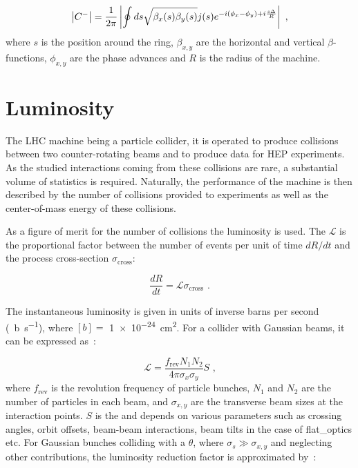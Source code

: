 \begin{equation}
    \left\lvert C^{-} \right\rvert = \frac{1}{2 \pi} \left\lvert  \oint ds \sqrt{\beta_x(s) \beta_y(s)} j(s) e^{-i \left( \phi_x - \phi_y \right) + i \frac{s \Delta}{R}}  \right\rvert \text{ ,}
    \label{equation:deltaqmin_guignard}
\end{equation}
where \(s\) is the position around the ring, \(\beta_{x,y}\) are the horizontal and vertical \(\beta\)-functions, \(\phi_{x,y}\) are the phase advances and \(R\) is the radius of the machine.

\section{Luminosity}
\label{section:luminosity}

The \gls{LHC} machine being a particle collider, it is operated to produce collisions between two counter-rotating beams and to produce data for \gls{HEP} \glspl{experiment}.
As the studied interactions coming from these collisions are rare, a substantial volume of statistics is required. 
Naturally, the performance of the machine is then described by the number of collisions provided to experiments as well as the center-of-mass energy of these collisions.

As a figure of merit for the number of collisions the \gls{luminosity} is used.
The  \(\mathcal{L}\) is the proportional factor between the number of events per unit of time \(dR / dt\) and the process cross-section \(\sigma_{\mathrm{cross}}\):

\begin{equation}
    \dfrac{dR}{dt} = \mathcal{L} \sigma_{\mathrm{cross}} \text{ .}
    \label{equation:instantaneous_luminosity_definition}
\end{equation}

The instantaneous luminosity is given in units of inverse barns per second (\unit{\per\barn\per\second}), where \(\left[ b \right] = \) \qty{1e-24}{\square\centi\meter}.
For a collider with Gaussian beams, it can be expressed as~\cite{CERN:Herr:Concept_Luminosity}:

\begin{equation}
    \mathcal{L} = \frac{f_{\mathrm{rev}} N_1 N_2}{4 \pi \sigma_x \sigma_y} S \text{ ,}
    \label{equation:luminosity_gaussian_beams}
\end{equation}
where \(f_{\mathrm{rev}}\) is the revolution frequency of particle bunches, \(N_1\) and \(N_2\) are the number of particles in each beam, and \(\sigma_{x,y}\) are the transverse beam sizes at the interaction points.
\(S\) is the  and depends on various parameters such as crossing angles, orbit offsets, beam-beam interactions, beam tilts in the case of \gls{flat_optics} etc.
For Gaussian bunches colliding with a  \(\theta\), where \(\sigma_s \gg \sigma_{x,y}\) and neglecting other contributions, the luminosity reduction factor is approximated by~\cite{CERN:Herr:Concept_Luminosity}:

